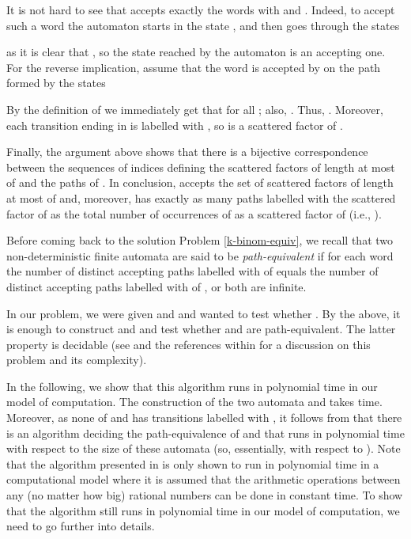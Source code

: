 \documentclass[runningheads]{llncs}
\begin{document}
It is not hard to see that  accepts exactly the words  with  and . Indeed, to accept such a word the automaton starts in the state , and then goes through the states 
 
as  it is clear that , so the state reached by the automaton is an accepting one. For the reverse implication, assume that the word  is accepted by  on the path formed by the states 
 

By the definition of  we immediately get that  for all ; also, . Thus,  . Moreover, each transition ending in  is labelled with , so  is a scattered factor of . 

Finally, the argument above shows that there is a bijective correspondence between the sequences of indices defining the scattered factors of length at most  of  and the paths of . In conclusion,  accepts the set of scattered factors of length at most  of  and, moreover, has exactly as many paths labelled with the scattered factor  of  as the total number of occurrences of  as a scattered factor of  (i.e., ). 

Before coming back to the solution Problem \ref{k-binom-equiv}, we recall that two non-deterministic finite automata are said to be \emph{path-equivalent} if for each word  the number of distinct accepting paths labelled with  of  equals the number of distinct accepting paths labelled with  of , or both are infinite. 

In our problem, we were given  and  and wanted to test whether . By the above, it is enough to construct  and  and test whether  and  are path-equivalent. The latter property is decidable (see \cite{siamNFA,Sak09} and the references within for a discussion on this problem and its complexity).

In the following, we show that this algorithm runs in polynomial time in our model of computation. The construction of the two automata  and  takes  time. Moreover, as none of  and  has transitions labelled with , it follows from \cite{siamNFA} that there is an algorithm deciding the path-equivalence of  and  that runs in polynomial time with respect to the size of these automata (so, essentially, with respect to ). Note that the algorithm presented in \cite{siamNFA} is only shown to run in polynomial time in a computational model where it is assumed that the arithmetic operations between any (no matter how big) rational numbers can be done in constant time. To show that the algorithm still runs in polynomial time in our model of computation, we need to go further into details. 
\end{document}
